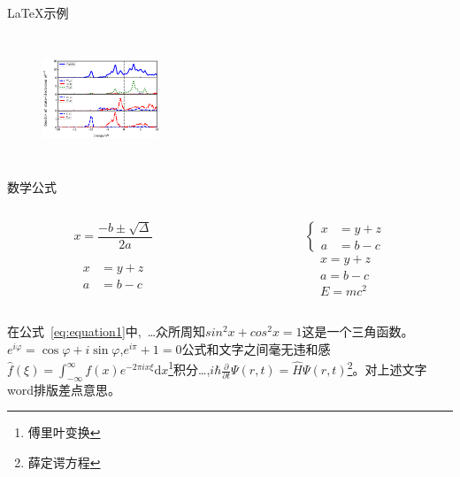 \documentclass{beamer}
\begin{document}
\begin{frame}{\LaTeX 示例}
\begin{columns}
\begin{columns}
	\hspace{0.1cm} 
		\begin{figure}
			\centering
			\includegraphics[width=3.5cm]{images/Figure_1.eps}
			\label{fig:Figure2}
		\end{figure}
	\end{columns}
				
\end{columns}
	\end{frame}

\begin{frame}{数学公式}
	\begin{columns}
		\begin{column}{0.5\textwidth}
			\begin{equation}
				x = \frac{-b \pm \sqrt{\Delta}}{2a}
				\label{eq:equation1}
			\end{equation}
	
				\begin{align}
					x &= y + z \\
					a &= b - c
				\end{align}

		\end{column}
	
		\begin{column}{0.5\textwidth}
			\begin{equation}
				\left\lbrace 
				\begin{aligned}
					\mathit{x} &= \mathit{y + z} \\
					\mathit{a} &= \mathit{b - c}
				\end{aligned}
				\right. 
			\end{equation}
			\begin{gather}
					\mathit{x = y + z} \\
					\mathit{a = b - c} \nonumber \\
					\mathit{E = mc^2}
			\end{gather} 
		\end{column}		
	\end{columns}
				
		 在公式~\ref{eq:equation1}中,~\dots 众所周知$sin^2x+cos^2x = 1$这是一个三角函数。$e^{i\varphi}=\cos \varphi +i\sin \varphi $,$e^{i\pi}+1=0$公式和文字之间毫无违和感$\hat{f}\left( \xi \right) =\int_{-\infty}^{\infty}{f\left( x \right) e^{-2\pi ix\xi}\text{d}x}$\footnote[frame]{傅里叶变换}积分\dots,$i\hbar \frac{\partial}{\partial t}\Psi(r,t) = \hat{H}\Psi(r,t)$\footnote[frame]{薛定谔方程}。对上述文字word排版差点意思。
			
\end{frame}	
\end{document}

